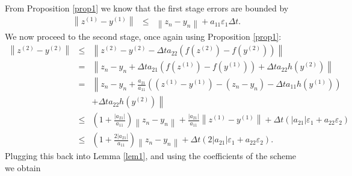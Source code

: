 \documentclass{siamart251104}
\newcommand{\dt}{\Delta t}
\begin{document}
From Proposition \ref{prop1} we know that the first stage errors
are bounded by
\begin{eqnarray*}
\left\| z^{(1)} - y^{(1)} \right\| & \leq &
\left\|z_{n} - y_{n} \right\|   
+ a_{11} \varepsilon_1 \dt   .
\end{eqnarray*}
We now proceed to the second stage, once again using 
Proposition \ref{prop1}:
\begin{eqnarray*}
\left \| z^{(2)} - y^{(2)}\right\| & \leq &
\left \| z^{(2)} - y^{(2)}  - \dt   a_{22}  \left(f(z^{(2)}) -  f(y^{(2)}) \right) \right\| \\
& = & \left \|z_n - y_n + \dt a_{21} \left( f(z^{(1)}) - f(y^{(1)}) \right) + \dt a_{22} h(y^{(2)}) \right\| \\
& = & \left \|z_n - y_n + 
\frac{a_{21}}{a_{11}} \left( (z^{(1)} - y^{(1)})
- (z_n - y_n) - \dt a_{11} h(y^{(1)}) \right) \right. \\
&& \left. + \dt a_{22} h(y^{(2)}) \right\| \\
& \leq  & \left(1 +  \frac{|a_{21}|}{a_{11}}\right) 
\left\|z_n - y_n\right\| +
\frac{|a_{21}|}{a_{11}}  \left\| z^{(1)} - y^{(1)} \right\| 
+  \dt \left(|a_{21}|\varepsilon_1 + a_{22} \varepsilon_2\right)  \\
& \leq & \left(1 +  \frac{2 |a_{21}|}{a_{11}}\right) 
\left\|z_n - y_n\right\| +
 \dt \left(2 |a_{21}| \varepsilon_1+ a_{22} \varepsilon_2\right) .
\end{eqnarray*}
Plugging this back into Lemma \ref{lem1}, and using the coefficients
of the scheme we obtain
\end{document}
